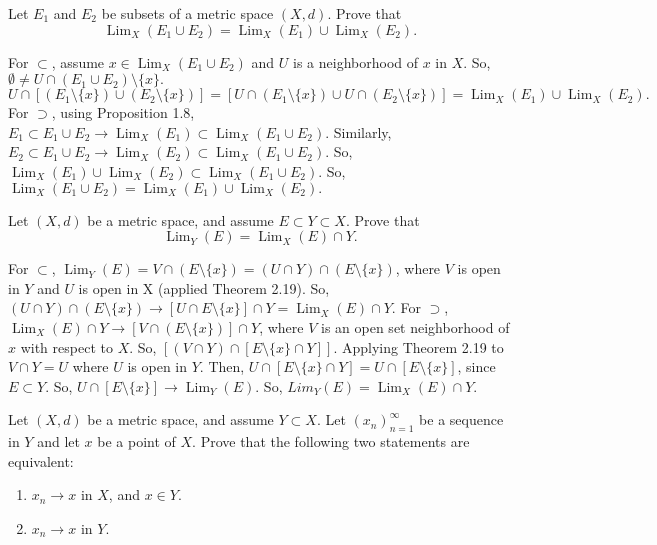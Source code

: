 \documentclass[12pt,letterpaper,boxed]{hmcpset}
\DeclareMathOperator{\Lim}{Lim}
\begin{document}

\begin{problem}[Exercise 1.9]
Let $E_1$ and $E_2$ be subsets of a metric space $(X,d).$ Prove that $$\Lim_X(E_1 \cup E_2) = \Lim_X(E_1)\cup\Lim_X(E_2).$$
\end{problem}

\begin{solution}
For $\subset$, assume $x\in \Lim_X(E_1\cup E_2)$ and $U$ is a neighborhood of $x$ in $X$. So, $\emptyset\neq U \cap (E_1 \cup E_2)\setminus \{x\}.$ $U \cap [(E_1\setminus\{x\})\cup(E_2\setminus\{x\})] = [U\cap(E_1\setminus\{x\})\cup U \cap (E_2\setminus\{x\})] = \Lim_X(E_1)\cup\Lim_X(E_2).$ For $\supset$, using Proposition 1.8, $E_1\subset E_1 \cup E_2 \rightarrow \Lim_X(E_1)\subset\Lim_X(E_1\cup E_2).$ Similarly, $E_2\subset E_1 \cup E_2 \rightarrow \Lim_X(E_2)\subset\Lim_X(E_1\cup E_2).$ So, $\Lim_X(E_1) \cup \Lim_X(E_2) \subset \Lim_X(E_1\cup E_2).$ So, $\Lim_X(E_1 \cup E_2) = \Lim_X(E_1)\cup\Lim_X(E_2).$
\end{solution}

\begin{problem}[Exercise 1.10]
Let $(X,d)$ be a metric space, and assume $E\subset Y \subset X.$ Prove that $$\Lim_Y(E) = \Lim_X(E)\cap Y.$$
\end{problem}

\begin{solution}
For $\subset$, $\Lim_Y(E) = V \cap (E\setminus\{x\}) = (U \cap Y)\cap(E\setminus\{x\})$, where $V$ is open in $Y$ and $U$ is open in X (applied Theorem 2.19). So, $(U \cap Y)\cap(E\setminus\{x\}) \rightarrow [U \cap E\setminus\{x\}]\cap Y = \Lim_X(E)\cap Y.$ For $\supset$, $\Lim_X(E)\cap Y \rightarrow [V \cap (E\setminus\{x\})]\cap Y$, where $V$ is an open set neighborhood of $x$ with respect to $X$. So, $[(V \cap Y)\cap[E\setminus\{x\}\cap Y]]$. Applying Theorem 2.19 to $V\cap Y = U$ where $U$ is open in $Y$. Then, $U\cap[E\setminus\{x\}\cap Y] = U \cap [E\setminus\{x\}]$, since $E \subset Y$. So, $U \cap [E\setminus\{x\}] \rightarrow \Lim_Y(E).$ So, $Lim_Y(E) = \Lim_X(E)\cap Y$.
\end{solution}


\begin{problem}[Exercise 1.13]
Let $(X,d)$ be a metric space, and assume $Y \subset X.$ Let $(x_n)_{n=1}^{\infty}$ be a sequence in $Y$ and let $x$ be a point of $X$. Prove that the following two statements are equivalent:
\vspace{-2mm}
\begin{enumerate}
	\itemsep0em
	\item $x_n \rightarrow x$ in $X$, and $x\in Y.$
	\item $x_n \rightarrow x$ in $Y$.
\end{enumerate}
\end{problem}
\end{document}
